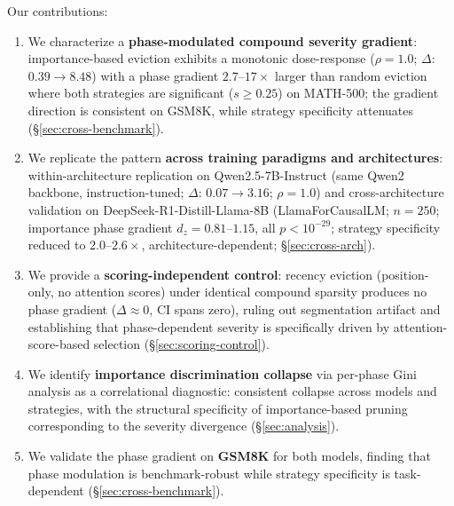 Our contributions:
\begin{enumerate}[nosep,leftmargin=*]
    \item We characterize a \textbf{phase-modulated compound severity gradient}: importance-based eviction exhibits a monotonic dose-response ($\rho{=}1.0$; $\Delta$: $0.39 \to 8.48$) with a phase gradient $2.7$--$17{\times}$ larger than random eviction where both strategies are significant ($s \geq 0.25$) on MATH-500; the gradient direction is consistent on GSM8K, while strategy specificity attenuates (\S\ref{sec:cross-benchmark}).
    \item We replicate the pattern \textbf{across training paradigms and architectures}: within-architecture replication on Qwen2.5-7B-Instruct (same Qwen2 backbone, instruction-tuned; $\Delta$: $0.07 \to 3.16$; $\rho{=}1.0$) and cross-architecture validation on DeepSeek-R1-Distill-Llama-8B (LlamaForCausalLM; $n{=}250$; importance phase gradient $d_z{=}0.81$--$1.15$, all $p < 10^{-29}$; strategy specificity reduced to $2.0$--$2.6{\times}$, architecture-dependent; \S\ref{sec:cross-arch}).
    \item We provide a \textbf{scoring-independent control}: recency eviction (position-only, no attention scores) under identical compound sparsity produces no phase gradient ($\Delta \approx 0$, CI spans zero), ruling out segmentation artifact and establishing that phase-dependent severity is specifically driven by attention-score-based selection (\S\ref{sec:scoring-control}).
    \item We identify \textbf{importance discrimination collapse} via per-phase Gini analysis as a correlational diagnostic: consistent collapse across models and strategies, with the structural specificity of importance-based pruning corresponding to the severity divergence (\S\ref{sec:analysis}).
    \item We validate the phase gradient on \textbf{GSM8K} for both models, finding that phase modulation is benchmark-robust while strategy specificity is task-dependent (\S\ref{sec:cross-benchmark}).
\end{enumerate}
